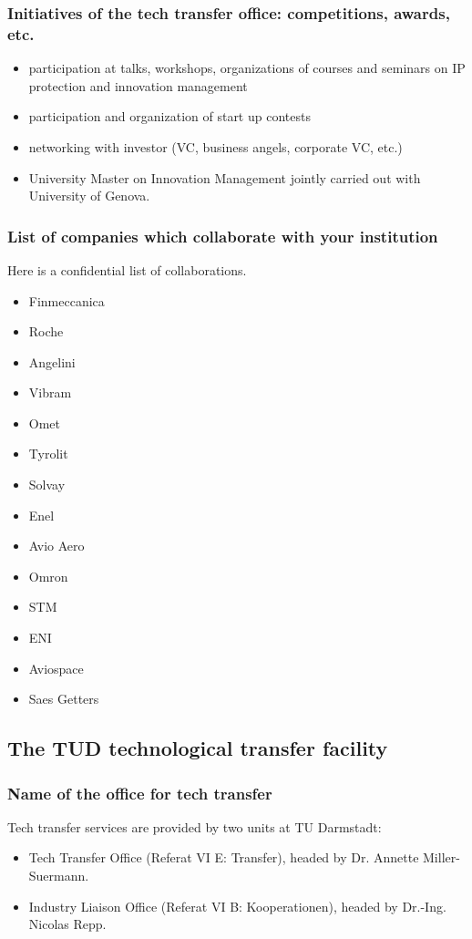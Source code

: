 \documentclass[12pt,a4paper,twoside]{article}
\begin{document}
\subsubsection{Initiatives of the tech transfer office: competitions, awards, etc.}
\begin{itemize}
\item participation at talks, workshops, organizations of courses and seminars on IP protection and innovation management
\item participation and organization of start up contests
\item networking with investor (VC, business angels, corporate VC, etc.)
\item University Master on Innovation Management jointly carried out with University of Genova.
\end{itemize}

\subsubsection{List of companies which collaborate with your institution}
Here is a confidential list of collaborations.
\begin{itemize}
\item Finmeccanica
\item Roche
\item Angelini
\item Vibram
\item Omet
\item Tyrolit
\item Solvay
\item Enel
\item Avio Aero
\item Omron
\item STM
\item ENI
\item Aviospace
\item Saes Getters
\end{itemize}

\subsection{The TUD technological transfer facility}

\subsubsection{Name of the office for tech transfer}
Tech transfer services are provided by two units at TU Darmstadt:
\begin{itemize}
\item Tech Transfer Office (Referat VI E: Transfer), headed by Dr. Annette Miller-Suermann.
\item Industry Liaison Office (Referat VI B: Kooperationen), headed by Dr.-Ing. Nicolas Repp.
\end{itemize}
\end{document}
